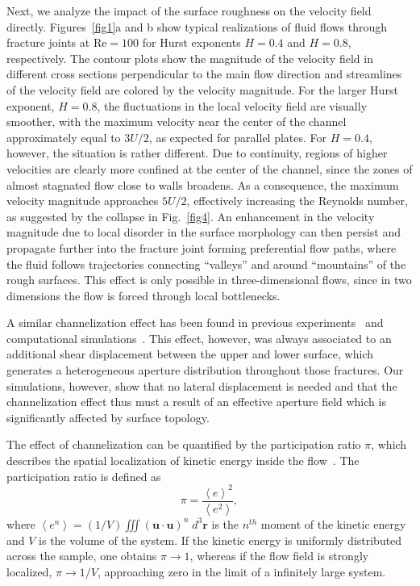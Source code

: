 \documentclass[aps,pre,
superscriptaddress,
twocolumn,
notitlepage,
10pt,
]{revtex4-1}
\begin{document}
Next, we analyze the impact of the surface roughness on the velocity field directly. 
Figures~\ref{fig1}a and b show typical realizations
of fluid flows through fracture joints at $\mathrm{Re} = 100$ for Hurst
exponents $H = 0.4$ and $H = 0.8$, respectively. The contour plots show the
magnitude of the velocity field in different cross sections perpendicular
to the main flow direction and streamlines of the velocity field are 
colored by the velocity magnitude. For the larger Hurst exponent, $H =
0.8$, the fluctuations in the local velocity field are visually smoother,
with the maximum velocity near the center of the channel approximately
equal to $3U/2$, as expected for parallel plates. For $H=0.4$, however, the
situation is rather different. Due to continuity, regions of higher
velocities are clearly more confined at the center of the channel, since the
zones of almost stagnated flow close to walls broadens. As a
consequence, the maximum velocity magnitude approaches $5U/2$, effectively
increasing the Reynolds number, as suggested by the collapse in
Fig.~\ref{fig4}. An enhancement in the velocity magnitude due to local
disorder in the surface morphology can then persist and propagate further
into the fracture joint forming preferential flow paths, where the fluid
follows trajectories connecting ``valleys'' and around ``mountains'' of the
rough surfaces. This effect is only possible in three-dimensional flows,
since in two dimensions the flow is forced through local bottlenecks. 

A similar channelization effect has been found in previous
experiments~\cite{Ishibashi2015} and computational simulations~\cite{Drazer2002,
	Lo2014, Huang2017}. This effect, however, was always associated to an additional
shear displacement between the upper and lower surface, which generates a
heterogeneous aperture distribution throughout those fractures.
Our simulations, however, show that no lateral displacement is needed and that
the channelization effect thus must a result of an effective aperture field
which is significantly affected by surface topology.

The  effect of channelization can be quantified by the participation ratio
$\pi$, which describes the spatial localization of kinetic energy inside
the flow~\cite{Andrade1999}. The participation ratio is defined as
\begin{equation}
\pi = \frac{\left<e\right>^2}{\left<e^2\right>},
\end{equation}
where $ \left<e^n\right> = (1/V) \iiint
\left(\mathbf{u}\cdot\mathbf{u}\right)^{n} \; d^3\mathbf{r} $ is the $
n^{th} $ moment of the kinetic energy and $ V $ is the volume of the
system. If the kinetic energy is uniformly distributed across the sample,
one obtains $\pi \rightarrow 1$, whereas if the flow field is strongly
localized, $ \pi \rightarrow 1/V$, approaching zero in the limit of a
infinitely large system. 
\end{document}
